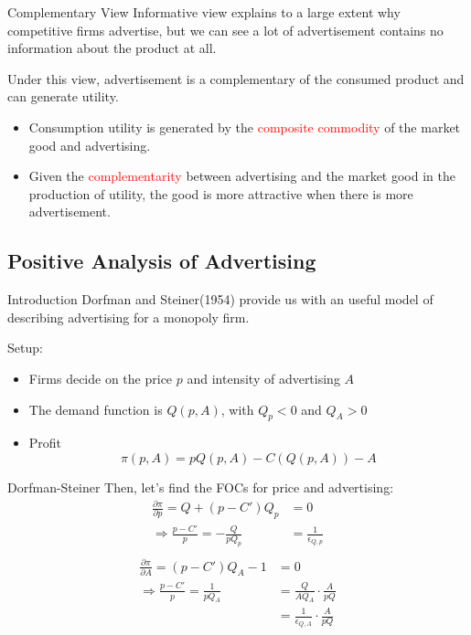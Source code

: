 \documentclass[10pt]{beamer}
\begin{document}
\begin{frame}{Complementary View}
Informative view explains to a large extent why competitive firms advertise, but we can see a lot of advertisement contains no information about the product at all.

Under this view, advertisement is a complementary of the consumed product and can generate utility.

\begin{itemize}
    \item Consumption utility is generated by the \textcolor{red}{composite commodity} of the market good and advertising.
    \item Given the \textcolor{red}{complementarity} between advertising and the market good in the production of utility, the good is more attractive when there is more advertisement.
\end{itemize}
\end{frame}


\subsection{Positive Analysis of Advertising}
\begin{frame}{Introduction}
Dorfman and Steiner(1954) provide us with an useful model of describing advertising for a monopoly firm.

Setup: 
\begin{itemize}
    \item Firms decide on the price $p$ and intensity of advertising $A$
    \item The demand function is $Q(p,A)$, with $Q_p <0$ and $Q_A > 0$
    \item Profit 
    \begin{equation}
        \pi(p,A) = p Q(p,A) - C(Q(p,A)) - A
    \end{equation}
\end{itemize}
\end{frame}

\begin{frame}{Dorfman-Steiner}
Then, let's find the FOCs for price and advertising:
\begin{equation}
\begin{split}
\frac{\partial \pi}{\partial p} = Q + (p - C')Q_p &= 0 \\
\Rightarrow \frac{p-C'}{p} = - \frac{Q}{p Q_p} &= \frac{1}{\epsilon_{Q,p}} \\
\end{split}
\end{equation}
\begin{equation}
\begin{split}
\frac{\partial \pi}{\partial A} = (p-C')Q_A - 1 &= 0 \\
\Rightarrow \frac{p-C'}{p} = \frac{1}{p Q_A} &= \frac{Q}{A Q_A} \cdot \frac{A}{pQ}\\
&= \frac{1}{\epsilon_{Q,A}} \cdot \frac{A}{p Q}
\end{split}
\end{equation}
\end{frame}
\end{document}

